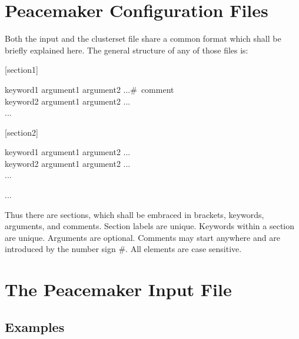 \documentclass{scrartcl}
\begin{document}
\section{Peacemaker Configuration Files}
\label{sec:config}

Both the input and the clusterset file share a common format which shall be briefly explained here.
The general structure of any of those files is:

\begin{addmargin}[1cm]{0cm}
    \ttfamily
    \begin{minipage}{\textwidth}
        [section1]
        \begin{addmargin}[1cm]{0cm}
            keyword1 argument1 argument2 ...\#\ comment \\
            keyword2 argument1 argument2 ...\\
            ...
        \end{addmargin}
    \end{minipage}

    \begin{minipage}{\textwidth}
        [section2]
        \begin{addmargin}[1cm]{0cm}
            keyword1 argument1 argument2 ... \\
            keyword2 argument1 argument2 ... \\
            ...
        \end{addmargin}
    \end{minipage}

    \begin{minipage}{\textwidth}
        ...
    \end{minipage}

\end{addmargin}

Thus there are sections, which shall be embraced in brackets, keywords, arguments, and comments.
Section labels are unique.
Keywords within a section are unique.
Arguments are optional.
Comments may start anywhere and are introduced by the number sign \#.
All elements are case sensitive.

\section{The Peacemaker Input File}
\label{sec:input}

\subsection{Examples}
\end{document}
